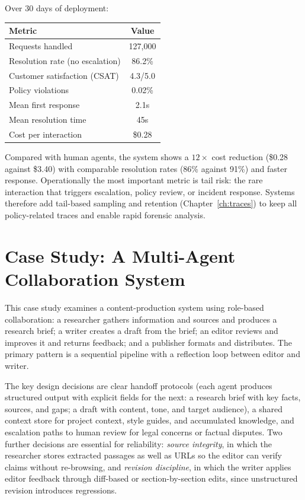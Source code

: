 \documentclass[11pt]{book}
\begin{document}
Over 30 days of deployment:

\begin{center}
\begin{tabular}{lc}
\toprule
Metric & Value \\
\midrule
Requests handled & 127{,}000 \\
Resolution rate (no escalation) & 86.2\% \\
Customer satisfaction (CSAT) & 4.3/5.0 \\
Policy violations & 0.02\% \\
Mean first response & 2.1s \\
Mean resolution time & 45s \\
Cost per interaction & \$0.28 \\
\bottomrule
\end{tabular}
\end{center}

Compared with human agents, the system shows a $12\times$ cost reduction (\$0.28 against \$3.40) with comparable resolution rates (86\% against 91\%) and faster response. Operationally the most important metric is tail risk: the rare interaction that triggers escalation, policy review, or incident response. Systems therefore add tail-based sampling and retention (Chapter~\ref{ch:traces}) to keep all policy-related traces and enable rapid forensic analysis.

\section{Case Study: A Multi-Agent Collaboration System}

This case study examines a content-production system using role-based collaboration: a researcher gathers information and sources and produces a research brief; a writer creates a draft from the brief; an editor reviews and improves it and returns feedback; and a publisher formats and distributes. The primary pattern is a sequential pipeline with a reflection loop between editor and writer.

The key design decisions are clear handoff protocols (each agent produces structured output with explicit fields for the next: a research brief with key facts, sources, and gaps; a draft with content, tone, and target audience), a shared context store for project context, style guides, and accumulated knowledge, and escalation paths to human review for legal concerns or factual disputes. Two further decisions are essential for reliability: \textit{source integrity}, in which the researcher stores extracted passages as well as URLs so the editor can verify claims without re-browsing, and \textit{revision discipline}, in which the writer applies editor feedback through diff-based or section-by-section edits, since unstructured revision introduces regressions.
\end{document}

